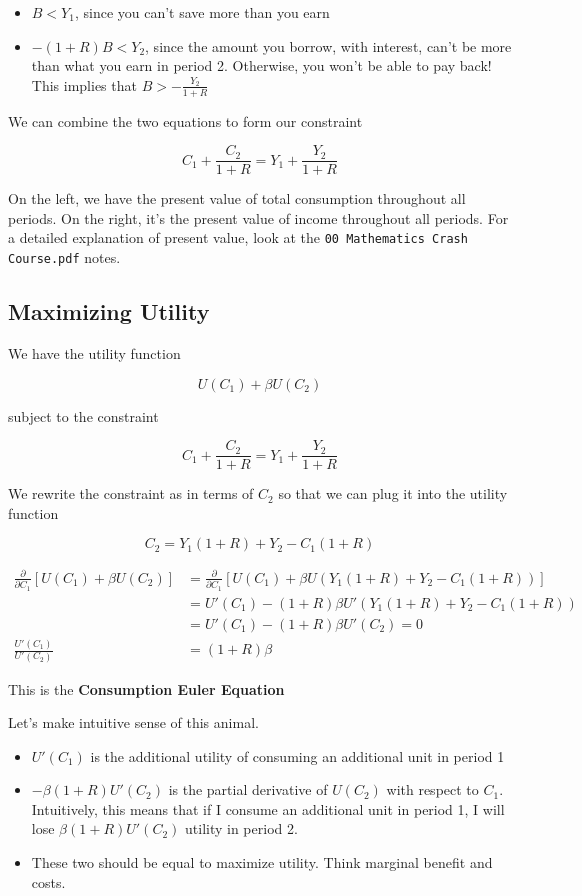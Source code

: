 \documentclass[11pt]{scrartcl}
\begin{document}
\begin{itemize}
\item $B < Y_1$, since you can't save more than you earn
\item $-(1+R)B < Y_2$, since the amount you borrow, with interest, can't be more than what you earn in period 2. Otherwise, you won't be able to pay back! This implies that $B > -\frac{Y_2}{1+R}$
\end{itemize}

We can combine the two equations to form our constraint 

\[ C_1 + \frac{C_2}{1+R} = Y_1 + \frac{Y_2}{1+R} \]

On the left, we have the present value of total consumption throughout all periods. On the right, it's the present value of income throughout all periods. For a detailed explanation of present value, look at the \texttt{00 Mathematics Crash Course.pdf} notes.

\subsection{Maximizing Utility}

We have the utility function

\[ U(C_1) + \beta U(C_2)\]

subject to the constraint

\[ C_1 + \frac{C_2}{1+R} = Y_1 + \frac{Y_2}{1+R} \]

We rewrite the constraint as in terms of $C_2$ so that we can plug it into the utility function

\[ C_2 = Y_1 (1+R) + Y_2 - C_1 (1+R) \]

\begin{align*}
\frac{\partial}{\partial C_1} \left[ U(C_1) + \beta U(C_2) \right] &= \frac{\partial}{\partial C_1} \left[ U(C_1) +  \beta U(Y_1 (1+R) + Y_2 - C_1 (1+R)) \right] \\
&= U'(C_1) - (1+R)\beta U'(Y_1 (1+R) + Y_2 - C_1 (1+R)) \\
&=  U'(C_1) - (1+R)\beta U'(C_2) = 0 \\
\frac{U'(C_1)}{U'(C_2)} &= (1+R)\beta 
\end{align*}

This is the \textbf{Consumption Euler Equation}

Let's make intuitive sense of this animal.

\begin{itemize}
\item $U'(C_1)$ is the additional utility of consuming an additional unit in period 1
\item $-\beta (1+R) U'(C_2)$ is the partial derivative of $U(C_2)$ with respect to $C_1$. Intuitively, this means that if I consume an additional unit in period 1, I will lose $\beta (1+R) U'(C_2)$ utility in period 2.
\item These two should be equal to maximize utility. Think marginal benefit and costs.
\end{itemize}
\end{document}
